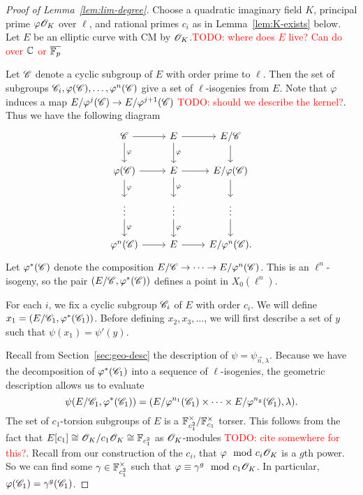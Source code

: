 \documentclass{amsart}
\begin{document}
\begin{proof}[Proof of Lemma~\ref{lem:lim-degree}]
  Choose a quadratic imaginary field $K$, principal prime $\varphi\mathscr{O}_K$ over $\ell$, and rational primes $c_i$ as in Lemma~\ref{lem:K-exists} below. Let $E$ be an elliptic curve with CM by $\mathscr{O}_K$.\textcolor{red}{TODO: where does $E$ live? Can do over $\mathbb{C}$ or $\overline{\mathbb{F}_p}$}

  Let $\mathscr{C}$ denote a cyclic subgroup of $E$ with order prime to $\ell$. Then the set of subgroups $\mathscr{C}_i, \varphi(\mathscr{C}), \dots, \varphi^n(\mathscr{C})$ give a set of $\ell$-isogenies from $E$. Note that $\varphi$ induces a map $E/\varphi^j(\mathscr{C}) \to E/\varphi^{j+1}(\mathscr{C})$ \textcolor{red}{TODO: should we describe the kernel?}. Thus we have the following diagram
  \[
    \begin{tikzcd}
      \sC \arrow[d,"\varphi"] \arrow[r] & E \arrow[d,"\varphi"] \arrow[r] & E/\sC \arrow[d]
      \\
      \varphi(\sC) \arrow[d,"\varphi"] \arrow[r] & E \arrow[d,"\varphi"] \arrow[r] & E/\varphi(\sC) \arrow[d]
      \\
      \vdots \arrow[d,"\varphi"] & \vdots \arrow[d,"\varphi"] & \vdots \arrow[d]
      \\
      \varphi^n(\sC) \arrow[r] & E \arrow[r] & E/\varphi^{n}(\sC).
    \end{tikzcd}
  \]
  Let $\varphi^{\ast}(\mathscr{C})$ denote the composition $E/\mathscr{C} \to \cdots \to E/\varphi^n(\mathscr{C})$. This is an $\ell^n$-isogeny, so the pair $(E/\mathscr{C},\varphi^{\ast}(\mathscr{C}))$ defines a point in $X_0(\ell^n)$.

  For each $i$, we fix a cyclic subgroup $\mathscr{C}_i$ of $E$ with order $c_i$. We will define $x_1 = (E/\mathscr{C}_1,\varphi^{\ast}(\mathscr{C}_1))$. Before defining $x_2,x_3,\dots$, we will first describe a set of $y$ such that $\psi(x_1) = \psi'(y)$.

  Recall from Section~\ref{sec:geo-desc} the description of $\psi = \psi_{\vec{n},\lambda}$. Because we have the decomposition of $\varphi^{\ast}(\mathscr{C}_1)$ into a sequence of $\ell$-isogenies, the geometric description allows us to evaluate
  \[
    \psi(E/\mathscr{C}_1,\varphi^{\ast}(\mathscr{C}_1)) = (E/\varphi^{n_1}(\mathscr{C}_1) \times \cdots \times E/\varphi^{n_g}(\mathscr{C}_1),\lambda).
  \]
  The set of $c_1$-torsion subgroups of $E$ is a $\mathbb{F}_{c_1^2}^\times/\mathbb{F}_{c_1}^\times$ torser. This follows from the fact that $E[c_1] \cong \mathscr{O}_K/c_1\mathscr{O}_K \cong \mathbb{F}_{c_1^2}$ as $\mathscr{O}_K$-modules \textcolor{red}{TODO: cite somewhere for this?}. Recall from our construction of the $c_i$, that $\varphi \mod{c_i\mathscr{O}_K}$ is a $g$th power. So we can find some $\gamma \in \mathbb{F}_{c_1^2}^\times$ such that $\varphi \equiv \gamma^g \mod{c_1\mathscr{O}_K}$. In particular, $\varphi(\mathscr{C}_1) = \gamma^g(\mathscr{C}_1)$.


\end{proof}
\end{document}
